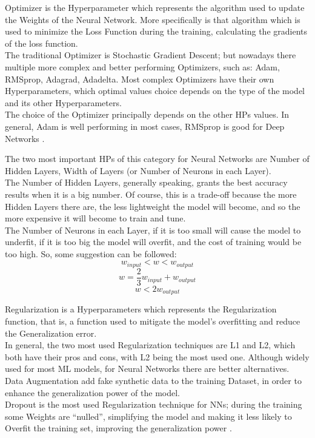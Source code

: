 Optimizer is the Hyperparameter which represents the algorithm used to update the Weights of the Neural Network.
More specifically is that algorithm which is used to minimize the Loss Function during the training, calculating the gradients of the loss function.
\\[0.3cm]The traditional Optimizer is Stochastic Gradient Descent; but nowadays there multiple more complex and better performing Optimizers, such as: Adam, RMSprop, Adagrad, Adadelta.
Most complex Optimizers have their own Hyperparameters, which optimal values choice depends on the type of the model and its other Hyperparameters.
\\[0.3cm]The choice of the Optimizer principally depends on the other HPs values. In general, Adam is well performing in most cases, RMSprop is good for Deep Networks \cite{Tesi-1.9}.

The two most important HPs of this category for Neural Networks are Number of Hidden Layers, Width of Layers (or Number of Neurons in each Layer).
\\[0.3cm]The Number of Hidden Layers, generally speaking, grants the best accuracy results when it is a big number. Of course, this is a trade-off because the more Hidden Layers there are, the less lightweight the model will become, and so the more expensive it will become to train and tune.
\\[0.3cm]The Number of Neurons in each Layer, if it is too small will cause the model to underfit, if it is too big the model will overfit, and the cost of training would be too high. So, some suggestion can be followed: \cite{Tesi-1.9}
\begin{equation}
	w_{input} < w < w_{output}
\end{equation}
\begin{equation}
	w = \frac{2}{3} w_{input} + w_{output}
\end{equation}
\begin{equation}
	w < 2 w_{output}
\end{equation}

Regularization is a Hyperparameters which represents the Regularization function, that is, a function used to mitigate the model's overfitting and reduce the Generalization error.
\\[0.3cm]In general, the two most used Regularization techniques are L1 and L2, which both have their pros and cons, with L2 being the most used one. Although widely used for most ML models, for Neural Networks there are better alternatives.
\\[0.3cm]Data Augmentation add fake synthetic data to the training Dataset, in order to enhance the generalization power of the model.
\\[0.3cm]Dropout is the most used Regularization technique for NNs; during the training some Weights are “nulled”, simplifying the model and making it less likely to Overfit the training set, improving the generalization power \cite{Tesi-1.9}.

